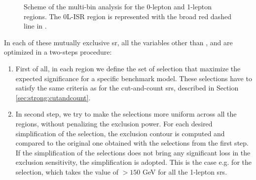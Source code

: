 \begin{figure}[htbp]
	\caption{Scheme of the multi-bin analysis for the  0-lepton 
	and  1-lepton regions. 
        The 0L-ISR region is represented with the broad red 
	dashed line in . 
      }
	\label{fig:multibin_scheme}
\end{figure}

In each of these mutually exclusive \gls{sr}, all the variables other than \njet, \nlep and \meff are optimized in a two-steps procedure:
\begin{enumerate}
\item First of all, in each region we define the set of selection that maximize the expected significance for a specific benchmark model. 
These selections have to satisfy the same criteria as for the cut-and-count \glspl{sr}, described in Section \ref{sec:strong:cutandcount}.
\item In  second step, we try to make the selections more uniform across all the regions, without penalizing the exclusion power. 
For each desired simplification of the selection, the exclusion contour is computed and compared to the original one obtained with the selections from the first step. If the simplification of the selections does not bring any significant loss in the exclusion sensitivity, the simplification is adopted. This is the case e.g. for the \mt selection, which takes the value of $>150$ GeV for all the 1-lepton \glspl{sr}.
\end{enumerate}




